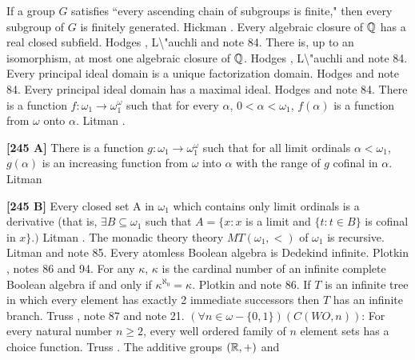 \medskip
{} If a group $G$ satisfies ``every ascending chain
of subgroups is finite," then every subgroup of $G$ is finitely generated.
\ac{Hickman} \cite{1976}.
\medskip
{} Every algebraic closure of $\Bbb Q$ has a real
closed subfield.  \ac{Hodges} \cite{1976a}, \ac{L\"auchli} \cite{1962}
and note 84.
\medskip
{} There is, up to an isomorphism, at most one algebraic
closure of ${\Bbb Q}$.  \ac{Hodges} \cite{1976a}, \ac{L\"auchli}
\cite{1962} and note 84.
\medskip
{}  Every  principal ideal domain is a unique
factorization domain.  \ac{Hodges} \cite{1976a} and note 84.
\medskip
{} Every principal ideal domain has a maximal ideal.
\ac{Hodges} \cite{1976a} and note 84.
\medskip
{} There is a function $f :\omega_1\rightarrow
\omega^{\omega}_1$ such that for every $\alpha$, $0 < \alpha < \omega_1$,
$f(\alpha )$ is a function from $\omega$ onto $\alpha$. \ac{Litman}
\cite{1976}.
\smallskip
\item{}{\bf [245 A]} There is a function $g : \omega_1\rightarrow
\omega^{\omega}_1$ such that for all limit ordinals $\alpha < \omega_1$,
$g(\alpha)$ is an increasing function from $\omega$  into $\alpha$ with
the range of $g$ cofinal in $\alpha$.  \ac{Litman} \cite{1976}
\smallskip
\item{}{\bf [245 B]} Every closed set A in $\omega_1$ which contains
only limit ordinals is a derivative  (that is, $\exists B\subseteq
\omega_{1}$ such that $A = \{x: x$ is a limit and $\{t: t\in B\}$
is cofinal in $x\}.)$  \ac{Litman} \cite{1976}.
\medskip
{} The monadic theory theory $MT(\omega_1,<)$ of
$\omega_1$ is recursive.  \ac{Litman} \cite{1976} and note 85.
\medskip
{} Every atomless Boolean algebra is Dedekind
infinite.  \ac{Plotkin} \cite{1976}, notes 86 and 94.
\medskip
{} For any $\kappa$, $\kappa$ is the cardinal number
of an infinite complete Boolean algebra if and only if $\kappa^{\aleph_0}
= \kappa $.  \ac{Plotkin} \cite{1976} and note 86.
\medskip
{}  If $T$ is an infinite tree in
which every element has exactly 2 immediate successors then $T$ has an
infinite branch.  \ac{Truss} \cite{1975}, note 87 and note 21.
\medskip
{} $(\forall n\in\omega-\{0,1\})(C(WO,n))$: For every
natural number $n\ge 2$, every well ordered family of $n$ element sets
has a choice function.  \ac{Truss} \cite{1975}.
\medskip
{} The additive groups $({\Bbb R},+)$ and
